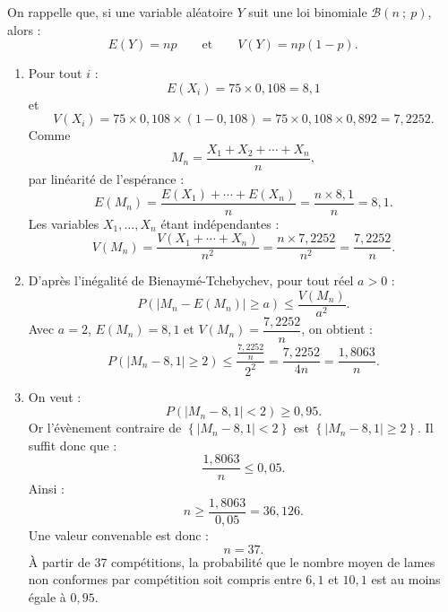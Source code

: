 On rappelle que, si une variable aléatoire $Y$ suit une loi binomiale $\mathcal{B}(n~;~p)$, alors :
\[
E(Y)=np\qquad\text{et}\qquad V(Y)=np(1-p).
\]
\begin{enumerate}
	\item Pour tout $i$ :
	\[
	E(X_i)=75\times 0,108=8,1
	\]
	et
	\[
	V(X_i)=75\times 0,108\times (1-0,108)=75\times 0,108\times 0,892=7,2252.
	\]
	Comme
	\[
	M_n=\dfrac{X_1+X_2+\cdots+X_n}{n},
	\]
	par linéarité de l'espérance :
	\[
	E(M_n)=\dfrac{E(X_1)+\cdots+E(X_n)}{n}=\dfrac{n\times 8,1}{n}=8,1.
	\]
	Les variables $X_1,\ldots,X_n$ étant indépendantes :
	\[
	V(M_n)=\dfrac{V(X_1+\cdots+X_n)}{n^2}
	=\dfrac{n\times 7,2252}{n^2}
	=\dfrac{7,2252}{n}.
	\]

	\item D'après l'inégalité de Bienaymé-Tchebychev, pour tout réel $a>0$ :
	\[
	P\left(\left|M_n-E(M_n)\right|\geqslant a\right)\leqslant \dfrac{V(M_n)}{a^2}.
	\]
	Avec $a=2$, $E(M_n)=8,1$ et $V(M_n)=\dfrac{7,2252}{n}$, on obtient :
	\[
	P\left(\left|M_n-8,1\right|\geqslant 2\right)
	\leqslant \dfrac{\frac{7,2252}{n}}{2^2}
	=\dfrac{7,2252}{4n}
	=\dfrac{1,8063}{n}.
	\]

	\item On veut :
	\[
	P\left(\left|M_n-8,1\right|<2\right)\geqslant 0,95.
	\]
	Or l'évènement contraire de $\left\{\left|M_n-8,1\right|<2\right\}$ est
	$\left\{\left|M_n-8,1\right|\geqslant 2\right\}$.
	Il suffit donc que :
	\[
	\dfrac{1,8063}{n}\leqslant 0,05.
	\]
	Ainsi :
	\[
	n\geqslant \dfrac{1,8063}{0,05}=36,126.
	\]
	Une valeur convenable est donc :
	\[
	n=37.
	\]
	À partir de 37 compétitions, la probabilité que le nombre moyen de lames non conformes par compétition soit compris entre $6,1$ et $10,1$ est au moins égale à $0,95$.
\end{enumerate}
